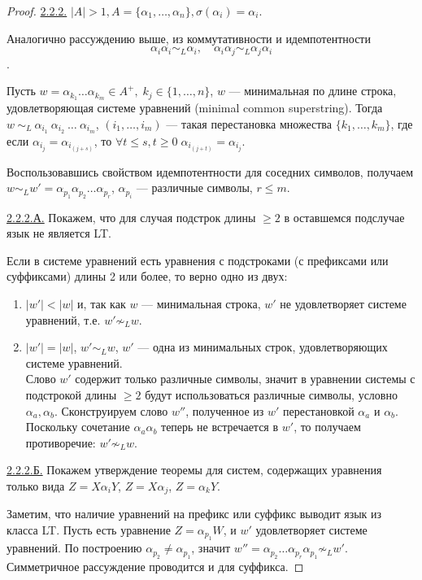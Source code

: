 \documentclass[fontsize=14pt]{scrartcl}
\begin{document}
\begin{proof}
    \underline{2.2.2.} $|A| > 1, A = \{\alpha_1, \ldots, \alpha_n\}, \sigma(\alpha_i) = \alpha_i$.

    Аналогично рассуждению выше, из коммутативности и идемпотентности 
    $$\alpha_i\alpha_i \sim_L \alpha_i, \quad \alpha_i\alpha_j \sim_L \alpha_j\alpha_i$$.
    
    Пусть $w = \alpha_{k_1} \ldots \alpha_{k_m} \in A^+,\; k_j \in \{1, \ldots, n\}$, $w$ --- минимальная по длине строка, удовлетворяющая системе уравнений (minimal common superstring).
    Тогда $w~\sim_L~\alpha_{i_1}~\alpha_{i_2}~\ldots~\alpha_{i_m}$, $(i_1, \ldots, i_m)$ --- такая 
    перестановка множества $\{k_1, \ldots, k_m\}$, где если $\alpha_{i_j} = \alpha_{i_{(j + s)}}$, то $\forall t \leq s, t \geq 0 \; \alpha_{i_{(j + t)}} = \alpha_{i_j}$.

    Воспользовавшись свойством идемпотентности для соседних символов, получаем $w \sim_L w' = \alpha_{p_1} \alpha_{p_2} \ldots \alpha_{p_r}$, $\alpha_{p_i}$ --- различные символы, $r \leq m$.

    \underline{2.2.2.А.} Покажем, что для случая подстрок длины $\geq 2$ в оставшемся подслучае язык не является LT.

    Если в системе уравнений есть уравнения с подстроками (с префиксами или суффиксами) длины 2 или более, то верно одно из двух:
    \begin{enumerate}
        \item $|w'| < |w|$ и, так как $w$ --- минимальная строка, $w'$ не удовлетворяет системе уравнений, т.е. $w' \not \sim_L w$.
        \item $|w'| = |w|$, $w' \sim_L w$, $w'$ --- одна из минимальных строк, удовлетворяющих системе уравнений. \\
        Слово $w'$ содержит только различные символы, значит в уравнении системы с подстрокой длины $\geq 2$ будут использоваться различные символы, условно $\alpha_a, \alpha_b$.
    Сконструируем слово $w''$, полученное из $w'$ перестановкой $\alpha_a$ и $\alpha_b$. Поскольку сочетание $\alpha_a \alpha_b$ теперь не встречается в $w'$, то 
    получаем противоречие: $w' \not \sim_L w$. 
    \end{enumerate}

    

    \underline{2.2.2.Б.} Покажем утверждение теоремы для систем, содержащих уравнения только вида $Z = X \alpha_i Y$, $Z = X \alpha_j$, $Z = \alpha_k Y$.
    
    Заметим, что наличие уравнений на префикс или суффикс выводит язык из класса LT. Пусть есть уравнение $Z = \alpha_{p_1} W$, и $w'$ удовлетворяет системе уравнений.
    По построению $\alpha_{p_2} \neq \alpha_{p_1}$, значит $w'' = \alpha_{p_2} \ldots \alpha_{p_r} \alpha_{p_1} \not \sim_L w'$. Симметричное рассуждение проводится и для суффикса.


\end{proof}
\end{document}
